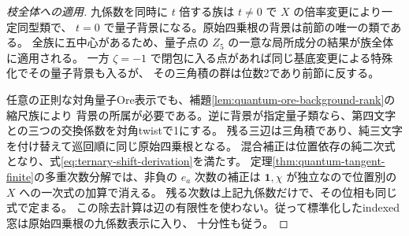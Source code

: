 \begin{proof}[枝全体への適用]
九係数を同時に $t$ 倍する族は $t\ne0$ で $X$ の倍率変更により一定同型類で、
$t=0$ で量子背景になる。原始四乗根の背景は前節の唯一の類である。
全族に五中心があるため、量子点の $Z_5$ の一意な局所成分の結果が族全体に適用される。
一方 $\zeta=-1$ で閉包に入る点があれば同じ基底変更による特殊化でその量子背景も入るが、
その三角積の群は位数2であり前節に反する。

任意の正則な対角量子Ore表示でも、補題\ref{lem:quantum-ore-background-rank}の縮尺族により
背景の所属が必要である。逆に背景が指定量子類なら、第四文字との三つの交換係数を対角twistで1にする。
残る三辺は三角積であり、純三文字を付け替えて巡回順に同じ原始四乗根となる。
混合補正は位置依存の純二次式となり、式\eqref{eq:ternary-shift-derivation}を満たす。
定理\ref{thm:quantum-tangent-finite}の多重次数分解では、非負の $e_a$ 次数の補正は
$\mathbf1,\chi$ が独立なので位置別の $X$ への一次式の加算で消える。
残る次数は上記九係数だけで、その位相も同じ式で定まる。
この除去計算は辺の有限性を使わない。従って標準化したindexed窓は原始四乗根の九係数表示に入り、
十分性も従う。
\end{proof}
